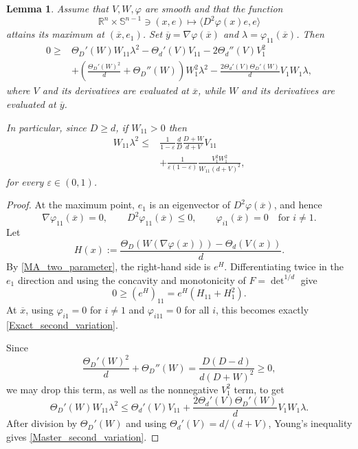 \documentclass[11pt,a4paper,reqno]{amsart}
\numberwithin{equation}{section}
\newtheorem{lemma}[theorem]{Lemma}
\theoremstyle{definition}
\newcommand{\<}{\ensuremath \leq}
\renewcommand{\>}{\ensuremath \geq}
\renewcommand{\epsilon}{\varepsilon}
\newcommand{\ThetaPar}{\Theta}
\begin{document}
\begin{lemma}\label{Two_parameter_differential_inequality}
Assume that $V,W,\varphi$ are smooth and that the function
\[
    \mathbb{R}^n\times \mathbb{S}^{n-1}\ni (x,e)\mapsto \langle D^2\varphi(x)e,e\rangle
\]
attains its maximum at $(\overline x,e_1)$. Set $\overline y=\nabla\varphi(\overline x)$ and $\lambda=\varphi_{11}(\overline x)$. Then
\begin{equation}\label{Exact_second_variation}
\begin{aligned}
0 \ge{}&
\ThetaPar_D'(W)W_{11}\lambda^2-\ThetaPar_d'(V)V_{11}
-2\ThetaPar_d''(V)V_1^2 \\
&+\left(\frac{\ThetaPar_D'(W)^2}{d}+\ThetaPar_D''(W)\right)W_1^2\lambda^2
-\frac{2\ThetaPar_d'(V)\ThetaPar_D'(W)}{d}V_1W_1\lambda,
\end{aligned}
\end{equation}
where $V$ and its derivatives are evaluated at $\overline x$, while $W$ and its derivatives are evaluated at $\overline y$.

In particular, since $D\ge d$, if $W_{11}>0$ then
\begin{equation}\label{Master_second_variation}
    \begin{aligned}
    W_{11}\lambda^2
    \le{}&
    \frac{1}{1-\epsilon}\frac{d}{D}\frac{D+W}{d+V}V_{11} \\
    &+
    \frac{1}{\epsilon(1-\epsilon)}
    \frac{V_1^2W_1^2}{W_{11}(d+V)^2},
    \end{aligned}
\end{equation}
for every $\epsilon\in(0,1)$.
\end{lemma}

\begin{proof}
At the maximum point, $e_1$ is an eigenvector of $D^2\varphi(\overline x)$, and hence
\[
    \nabla\varphi_{11}(\overline x)=0,\qquad
    D^2\varphi_{11}(\overline x)\le 0,\qquad
    \varphi_{i1}(\overline x)=0 \quad \text{for } i\neq 1.
\]
Let
\[
    H(x):=\frac{\ThetaPar_D(W(\nabla\varphi(x)))-\ThetaPar_d(V(x))}{d}.
\]
By \cref{MA_two_parameter}, the right-hand side is $e^H$. Differentiating twice in the $e_1$ direction and using the concavity and monotonicity of $F=\det^{1/d}$ give
\[
    0\ge (e^H)_{11}=e^H(H_{11}+H_1^2).
\]
At $\overline x$, using $\varphi_{i1}=0$ for $i\neq 1$ and $\varphi_{i11}=0$ for all $i$, this becomes exactly \cref{Exact_second_variation}.

Since
\[
    \frac{\ThetaPar_D'(W)^2}{d}+\ThetaPar_D''(W)
    =
    \frac{D(D-d)}{d(D+W)^2}\ge 0,
\]
we may drop this term, as well as the nonnegative $V_1^2$ term, to get
\[
    \ThetaPar_D'(W)W_{11}\lambda^2
    \le
    \ThetaPar_d'(V)V_{11}
    +\frac{2\ThetaPar_d'(V)\ThetaPar_D'(W)}{d}V_1W_1\lambda.
\]
After division by $\ThetaPar_D'(W)$ and using $\ThetaPar_d'(V)=d/(d+V)$, Young's inequality gives \cref{Master_second_variation}.
\end{proof}
\end{document}
